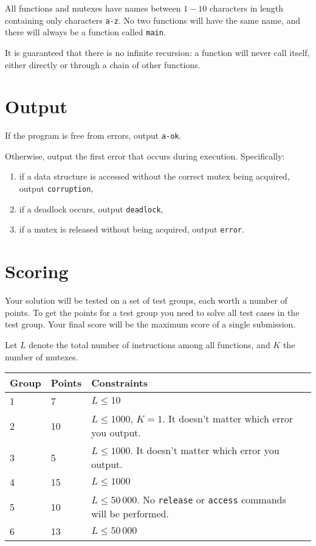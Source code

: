All functions and mutexes have names between $1-10$ characters in length containing only characters \texttt{a-z}.
No two functions will have the same name, and there will always be a function called \texttt{main}.

It is guaranteed that there is no infinite recursion: a function will never call itself, either directly or through a chain of other functions.

\section*{Output}
If the program is free from errors, output \texttt{a-ok}.

Otherwise, output the first error that occurs during execution. Specifically:
\begin{enumerate}
  \item if a data structure is accessed without the correct mutex being acquired, output \texttt{corruption},
  \item if a deadlock occurs, output \texttt{deadlock},
  \item if a mutex is released without being acquired, output \texttt{error}.
\end{enumerate}

\section*{Scoring}
Your solution will be tested on a set of test groups, each worth a number of points.
To get the points for a test group you need to solve all test cases in the test group.
Your final score will be the maximum score of a single submission.

Let $L$ denote the total number of instructions among all functions, and $K$ the number of mutexes.

\noindent
\begin{tabular}{| l | l | l | l |}
\hline
Group & Points & Constraints \\ \hline
1     & 7      & $L \le 10$ \\ \hline
2     & 10     & $L \le 1000$, $K = 1$. It doesn't matter which error you output. \\ \hline
3     & 5      & $L \le 1000$. It doesn't matter which error you output. \\ \hline
4     & 15     & $L \le 1000$ \\ \hline
5     & 10     & $L \le 50\,000$. No \texttt{release} or \texttt{access} commands will be performed. \\ \hline
6     & 13     & $L \le 50\,000$ \\ \hline
\end{tabular}
